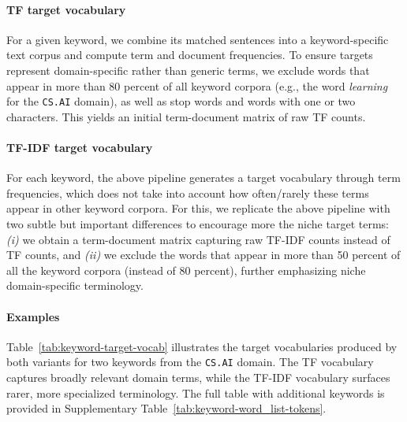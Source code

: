 \documentclass[10pt]{article}
\begin{document}
\paragraph{TF target vocabulary}
For a given keyword, we combine its matched sentences into a keyword-specific text corpus and compute term and document frequencies. To ensure targets represent domain-specific rather than generic terms, we exclude words that appear in more than 80 percent of all keyword corpora (e.g., the word \emph{learning} for the \texttt{CS.AI} domain), as well as stop words and words with one or two characters. This yields an initial term-document matrix of raw TF counts. 

\paragraph{TF-IDF target vocabulary}
For each keyword, the above pipeline generates a target vocabulary through term frequencies, which does not take into account how often/rarely these terms appear in other keyword corpora. For this, we replicate the above pipeline with two subtle but important differences to encourage more the niche target terms: \textit{(i)} we obtain a term-document matrix capturing raw TF-IDF counts instead of TF counts, and \textit{(ii)} we exclude the words that appear in more than 50 percent of all the keyword corpora (instead of 80 percent), further emphasizing niche domain-specific terminology. 

\paragraph{Examples} Table~\ref{tab:keyword-target-vocab} illustrates the target vocabularies produced by both variants for two keywords from the \texttt{CS.AI} domain. The TF vocabulary captures broadly relevant domain terms, while the TF-IDF vocabulary surfaces rarer, more specialized terminology. The full table with additional keywords is provided in Supplementary Table~\ref{tab:keyword-word_list-tokens}.
\end{document}

